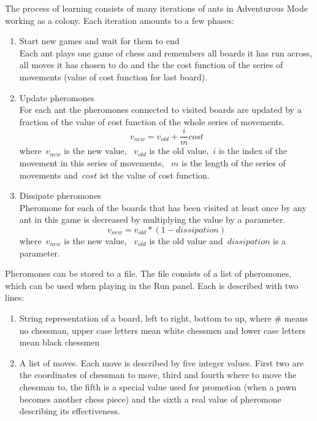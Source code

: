 \documentclass[pdftex]{article}
\begin{document}
The process of learning consists of many iterations of ants in Adventurous Mode working as a colony. Each iteration amounts to a few phases:
\begin{enumerate}
 	\item Start new games and wait for them to end \hfill \\
		Each ant plays one game of chess and remembers all boards it has run across, all moves it has chosen to do and the
the cost function of the series of movements (value of cost function for last board).
	\item Update pheromones \hfill \\
		For each ant the pheromones connected to visited boards are updated by a fraction of the value of cost function of the whole series of movements.
\begin{equation}
	v_{new} = v_{old} + \frac{i}{m} cost
\end{equation}
where~$v_{new}$ is the new value, ~$v_{old}$ is the old value,~$i$ is the index of the movement in this series of movements, ~$m$ is the length of the series of movements and~$cost$ ist the value of cost function.
	\item Dissipate pheromones \hfill \\
		Pheromone for each of the boards that has been visited at least once by any ant in this game is decreased by multiplying the value by a parameter.
\begin{equation}
\label{eq:dissipationequation}
	v_{new} =  v_{old} *  (1 - dissipation)
\end{equation}
where~$v_{new}$ is the new value, ~$v_{old}$ is the old value and~$dissipation$ is a parameter. 
\end{enumerate}

Pheromones can be stored to a file. The file consists of a list of pheromones, which can be used when playing in the Run panel. Each is described with two lines:
\begin{enumerate}
 	\item String representation of a board, left to right, bottom to up, where \# means no chessman, upper case letters mean white chessmen and lower case letters mean black chessmen \hfill \\
	\item A list of moves. Each move is described by five integer values. First two are the coordinates of chessman to move, third and fourth where to move the chessman to, the fifth is a special value used for promotion (when a pawn becomes another chess piece) and the sixth a real value of pheromone describing its effectiveness. \hfill \\
\end{enumerate}
\end{document}
